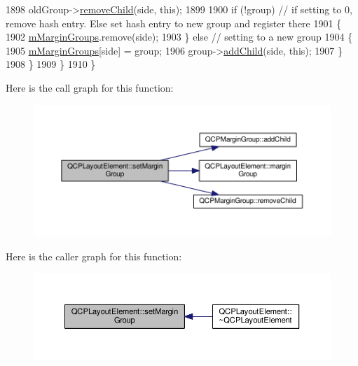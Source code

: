 \begin{DoxyCode}
1898         oldGroup->\hyperlink{class_q_c_p_margin_group_a20ab3286062957d99b58db683fe725b0}{removeChild}(side, \textcolor{keyword}{this});
1899       
1900       \textcolor{keywordflow}{if} (!group) \textcolor{comment}{// if setting to 0, remove hash entry. Else set hash entry to new group and register
       there}
1901       \{
1902         \hyperlink{class_q_c_p_layout_element_aeafbbc1130e02eee663c5326761fc963}{mMarginGroups}.remove(side);
1903       \} \textcolor{keywordflow}{else} \textcolor{comment}{// setting to a new group}
1904       \{
1905         \hyperlink{class_q_c_p_layout_element_aeafbbc1130e02eee663c5326761fc963}{mMarginGroups}[side] = group;
1906         group->\hyperlink{class_q_c_p_margin_group_acb9c3a35acec655c2895b7eb95ee0524}{addChild}(side, \textcolor{keyword}{this});
1907       \}
1908     \}
1909   \}
1910 \}
\end{DoxyCode}


Here is the call graph for this function\+:\nopagebreak
\begin{figure}[H]
\begin{center}
\leavevmode
\includegraphics[width=350pt]{class_q_c_p_layout_element_a516e56f76b6bc100e8e71d329866847d_cgraph}
\end{center}
\end{figure}




Here is the caller graph for this function\+:\nopagebreak
\begin{figure}[H]
\begin{center}
\leavevmode
\includegraphics[width=350pt]{class_q_c_p_layout_element_a516e56f76b6bc100e8e71d329866847d_icgraph}
\end{center}
\end{figure}


